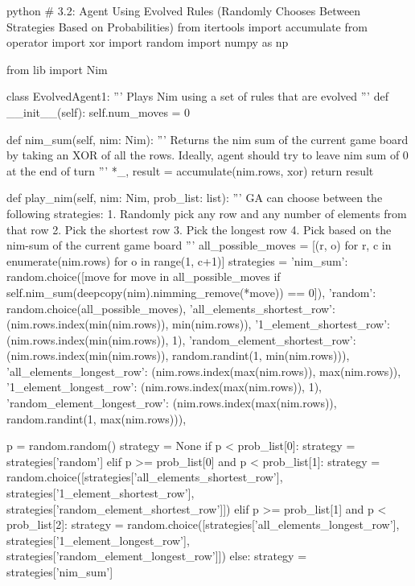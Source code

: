 \begin{mintedbox}{python}
    # 3.2: Agent Using Evolved Rules (Randomly Chooses Between Strategies Based on Probabilities)
    from itertools import accumulate
    from operator import xor
    import random
    import numpy as np

    from lib import Nim

    class EvolvedAgent1:
        '''
        Plays Nim using a set of rules that are evolved
        '''
        def __init__(self):
            self.num_moves = 0

        def nim_sum(self, nim: Nim):
            '''
            Returns the nim sum of the current game board
            by taking an XOR of all the rows.
            Ideally, agent should try to leave nim sum of 0 at the end of turn
            '''
            *_, result = accumulate(nim.rows, xor)
            return result

        def play_nim(self, nim: Nim, prob_list: list):
            '''
            GA can choose between the following strategies:
            1. Randomly pick any row and any number of elements from that row
            2. Pick the shortest row
            3. Pick the longest row
            4. Pick based on the nim-sum of the current game board
            '''
            all_possible_moves = [(r, o) for r, c in enumerate(nim.rows) for o in range(1, c+1)]
            strategies = {
                'nim_sum': random.choice([move for move in all_possible_moves if self.nim_sum(deepcopy(nim).nimming_remove(*move)) == 0]),
                'random': random.choice(all_possible_moves),
                'all_elements_shortest_row': (nim.rows.index(min(nim.rows)), min(nim.rows)),
                '1_element_shortest_row': (nim.rows.index(min(nim.rows)), 1),
                'random_element_shortest_row': (nim.rows.index(min(nim.rows)), random.randint(1, min(nim.rows))),
                'all_elements_longest_row': (nim.rows.index(max(nim.rows)), max(nim.rows)),
                '1_element_longest_row': (nim.rows.index(max(nim.rows)), 1),
                'random_element_longest_row': (nim.rows.index(max(nim.rows)), random.randint(1, max(nim.rows))),
            }

            p = random.random()
            strategy = None
            if p < prob_list[0]:
                strategy = strategies['random']
            elif p >= prob_list[0] and p < prob_list[1]:
                strategy = random.choice([strategies['all_elements_shortest_row'], strategies['1_element_shortest_row'], strategies['random_element_shortest_row']])
            elif p >= prob_list[1] and p < prob_list[2]:
                strategy = random.choice([strategies['all_elements_longest_row'], strategies['1_element_longest_row'], strategies['random_element_longest_row']])
            else:
                strategy = strategies['nim_sum']


\end{mintedbox}

